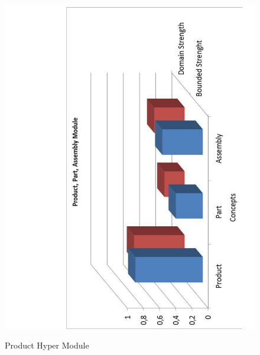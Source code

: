 \begin{figure}
	\centering
	\scriptsize
	\begin{minipage}{.45\textwidth}
		\includegraphics[scale=0.35, angle=-90]{figure-chapterIV/fig4-18.pdf}\\
		\caption{Product Hyper Module}
		\label{figure4-18}
	\end{minipage}%
	\begin{minipage}{.55\textwidth}

\end{minipage}
\end{figure}
